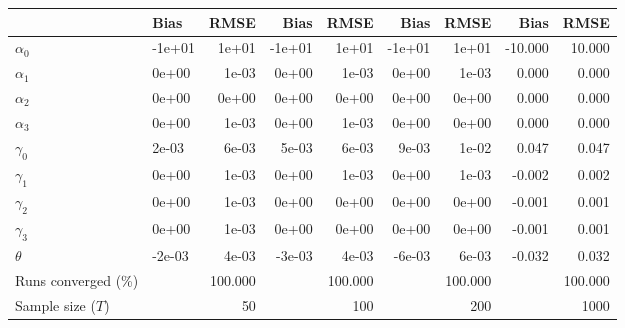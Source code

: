 
\begin{tabular}[t]{llrrrrrrr}
\toprule
  & Bias & RMSE & Bias & RMSE & Bias & RMSE & Bias & RMSE\\
\midrule
$\alpha_{0}$ & -1e+01 & 1e+01 & -1e+01 & 1e+01 & -1e+01 & 1e+01 & -10.000 & 10.000\\
$\alpha_{1}$ & 0e+00 & 1e-03 & 0e+00 & 1e-03 & 0e+00 & 1e-03 & 0.000 & 0.000\\
$\alpha_{2}$ & 0e+00 & 0e+00 & 0e+00 & 0e+00 & 0e+00 & 0e+00 & 0.000 & 0.000\\
$\alpha_{3}$ & 0e+00 & 1e-03 & 0e+00 & 1e-03 & 0e+00 & 0e+00 & 0.000 & 0.000\\
$\gamma_{0}$ & 2e-03 & 6e-03 & 5e-03 & 6e-03 & 9e-03 & 1e-02 & 0.047 & 0.047\\
$\gamma_{1}$ & 0e+00 & 1e-03 & 0e+00 & 1e-03 & 0e+00 & 1e-03 & -0.002 & 0.002\\
$\gamma_{2}$ & 0e+00 & 1e-03 & 0e+00 & 0e+00 & 0e+00 & 0e+00 & -0.001 & 0.001\\
$\gamma_{3}$ & 0e+00 & 1e-03 & 0e+00 & 0e+00 & 0e+00 & 0e+00 & -0.001 & 0.001\\
$\theta$ & -2e-03 & 4e-03 & -3e-03 & 4e-03 & -6e-03 & 6e-03 & -0.032 & 0.032\\
Runs converged (\%) &  & 100.000 &  & 100.000 &  & 100.000 &  & 100.000\\
Sample size ($T$) &  & 50 &  & 100 &  & 200 &  & 1000\\
\bottomrule
\end{tabular}
